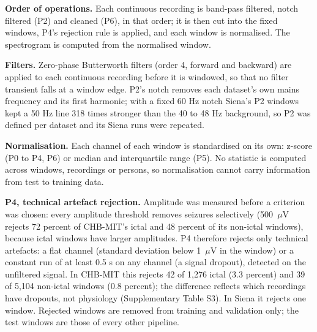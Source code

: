 \documentclass[11pt,a4paper]{article}
\begin{document}
\endgroup

\textbf{Order of operations.} Each continuous recording is band-pass filtered, notch
filtered (P2) and cleaned (P6), in that order; it is then cut into the fixed windows,
P4's rejection rule is applied, and each window is normalised. The spectrogram is
computed from the normalised window.

\textbf{Filters.} Zero-phase Butterworth filters (order 4, forward and backward) are
applied to each continuous recording before it is windowed, so that no filter
transient falls at a window edge. P2's notch removes each dataset's own mains
frequency and its first harmonic; with a fixed 60 Hz notch Siena's P2 windows kept a
50 Hz line 318 times stronger than the 40 to 48 Hz background, so P2 was defined per
dataset and its Siena runs were repeated.

\textbf{Normalisation.} Each channel of each window is standardised on its own: z-score
(P0 to P4, P6) or median and interquartile range (P5). No statistic is computed across
windows, recordings or persons, so normalisation cannot carry information from test to
training data.

\textbf{P4, technical artefact rejection.} Amplitude was measured before a criterion was
chosen: every amplitude threshold removes seizures selectively (500~\(\mu\)V rejects 72
percent of CHB-MIT's ictal and 48 percent of its non-ictal windows), because ictal
windows have larger amplitudes. P4 therefore rejects only technical artefacts: a flat
channel (standard deviation below 1~\(\mu\)V in the window) or a constant run of at least
0.5 s on any channel (a signal dropout), detected on the unfiltered signal. In CHB-MIT
this rejects 42 of 1,276 ictal (3.3 percent) and 39 of 5,104 non-ictal windows (0.8
percent); the difference reflects which recordings have dropouts, not physiology
(Supplementary Table S3). In Siena it rejects one window. Rejected windows are removed
from training and validation only; the test windows are those of every other
pipeline.
\end{document}
